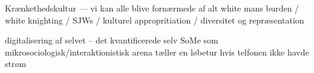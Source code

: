 Krænkethedskultur --- vi kan alle blive fornærmede af alt
 white mans burden / white knighting / SJWs / kulturel appropritiation / diversitet og repræsentation

digitalisering af selvet -- det kvantificerede selv
    SoMe som mikrosociologisk/interaktionistisk arena
    tæller en løbetur hvis telfonen ikke havde strøm
